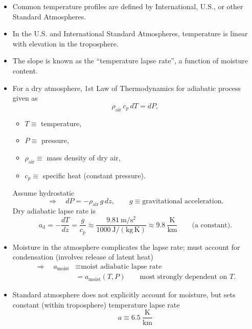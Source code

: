 \documentclass[11pt, oneside]{article}
\begin{document}
\begin{itemize}
	\item Common temperature profiles are defined by International, U.S., or other Standard Atmospheres.
	\item In the U.S. and International Standard Atmospheres, temperature is linear with elevation in the troposphere.
	\item The slope is known as the ``temperature lapse rate'', a function of moisture content.
	\item For a dry atmosphere, 1st Law of Thermodynamics for adiabatic process given as
	\begin{equation}
		\label{e:first}
		\rho_\mathrm{air}\,c_p\,dT = dP,
	\end{equation}
	\begin{itemize}
		\item[] $T \equiv$ temperature,
		\item[] $P \equiv$ pressure,
		\item[] $\rho_\mathrm{air} \equiv$ mass density of dry air,
		\item[] $c_p \equiv$ specific heat (constant pressure).
	\end{itemize}
	Assume hydrostatic
	\begin{equation}
		\label{e:hydro}
		\Rightarrow\quad dP = -\rho_\mathrm{air}\,g\,dz, \qquad g \equiv \text{gravitational acceleration}.
	\end{equation}
	Dry adiabatic lapse rate is
	\begin{equation}
		\label{e:ad}
		a_\mathrm{d} = -\frac{dT}{dz} = \frac{g}{c_p} \approx \frac{9.81~\mathrm{m/s^2}}{1000~\mathrm{J/(kg\,K)}} \approx 9.8~\frac{\mathrm{K}}{\mathrm{km}} \qquad \text{(a constant)}.
	\end{equation}
	\item Moisture in the atmosphere complicates the lapse rate; must account for condensation (involves release of latent heat)
	\begin{align*}
		\Rightarrow\quad a_\mathrm{moist} &\equiv \text{moist adiabatic lapse rate}\\
		&= a_\mathrm{moist}(T,P) \qquad \text{most strongly dependent on } T.
	\end{align*}
	\item Standard atmosphere does not explicitly account for moisture, but sets constant (within troposphere) temperature lapse rate
	\begin{equation}
		\label{e:a}
		\boxed{a \equiv 6.5~\frac{\mathrm{K}}{\mathrm{km}}}
	\end{equation}
\end{itemize}
\end{document}
